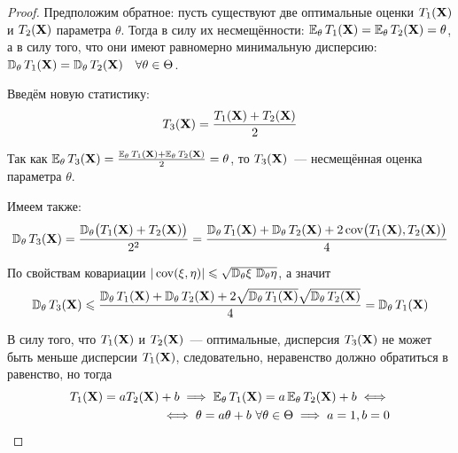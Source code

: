 \begin{proof}
    Предположим обратное: пусть существуют две оптимальные оценки $T_1(\mathbf{X})$ и $T_2(\mathbf{X})$ параметра $\theta$. 
    Тогда в силу их несмещённости: $\operatorname{\operatorname{\mathbb{E}}_{\theta}}  T_{1}(\mathbf{X}) = \operatorname{\operatorname{\mathbb{E}}_{\theta}} T_{2}(\mathbf{X}) = \theta$,
    а в силу того, что они имеют равномерно минимальную дисперсию: $\operatorname{\mathbb{D}_{\theta}}  T_{1}(\mathbf{X})=\operatorname{\mathbb{D}_{\theta}}  T_{2}(\mathbf{X}) \quad \forall \theta \in \Theta$.

    Введём новую статистику: 
    \begin{equation*}
        T_{3}(\mathbf{X})=\frac{T_{1}(\mathbf{X})+T_{2}(\mathbf{X})}{2}
    \end{equation*}

    Так как $\operatorname{\operatorname{\mathbb{E}}_{\theta}}  T_{3}(\mathbf{X})=\frac{\operatorname{\operatorname{\mathbb{E}}_{\theta}}  T_{1}(\mathbf{X})+\operatorname{\operatorname{\mathbb{E}}_{\theta}}  T_{2}(\mathbf{X})}{2}=\theta$, то $T_{3}(\mathbf{X})$~--- несмещённая оценка параметра $\theta$.

    Имеем также:
    \begin{equation*}
        \operatorname{\mathbb{D}_{\theta}}  T_{3}(\mathbf{X}) = 
        \frac{\operatorname{\mathbb{D}_{\theta}} \bigl(T_{1}(\mathbf{X})+T_{2}(\mathbf{X})\bigr)}{2^2} =
        \frac{\operatorname{\mathbb{D}_{\theta}}  T_{1}(\mathbf{X})+\operatorname{\mathbb{D}_{\theta}}  T_{2}(\mathbf{X})+2 \operatorname{cov}\bigl(T_{1}(\mathbf{X}), T_{2}(\mathbf{X})\bigr)}{4}
    \end{equation*}

    По свойствам ковариации $| \operatorname{cov}(\xi, \eta)| \leqslant \sqrt{\operatorname{\mathbb{D}_{\theta}} \!\xi \, \operatorname{\mathbb{D}_{\theta}} \!\eta}$, а значит
    \begin{equation*}
        \operatorname{\mathbb{D}_{\theta}}  T_{3}(\mathbf{X}) \leqslant \frac{\operatorname{\mathbb{D}_{\theta}}  T_{1}(\mathbf{X})+\operatorname{\mathbb{D}_{\theta}}  T_{2}(\mathbf{X})+2 \sqrt{\operatorname{\mathbb{D}_{\theta}}  T_{1}(\mathbf{X})} \sqrt{\operatorname{\mathbb{D}_{\theta}}  T_{2}(\mathbf{X})}}{4} =\operatorname{\mathbb{D}_{\theta}}  T_{1}(\mathbf{X})
    \end{equation*}

    В силу того, что $T_1(\mathbf{X})$ и $T_2(\mathbf{X})$~--- оптимальные, дисперсия $T_3(\mathbf{X})$ не может быть меньше дисперсии $T_1(\mathbf{X})$, 
    следовательно, неравенство должно обратиться в равенство, но тогда
    \begin{equation*}
    \begin{aligned}
        T_{1}(\mathbf{X})=a T_{2}(\mathbf{X})+b \implies \operatorname{\operatorname{\mathbb{E}}_{\theta}}  T_{1}(\mathbf{X})
        = a \operatorname{\operatorname{\mathbb{E}}_{\theta}}  T_{2}(\mathbf{X})+b
        \iff \\
        \iff \theta = a \theta + b~ \forall \theta \in \Theta \implies a = 1, b = 0 \qedhere
    \end{aligned}
    \end{equation*}
\end{proof}
